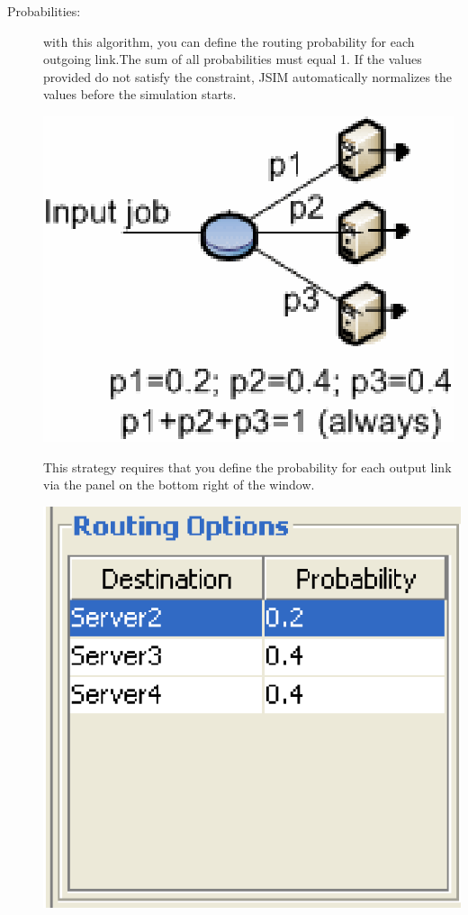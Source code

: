 \begin{description}
\item[Probabilities:] with this algorithm, you can define the routing probability for each outgoing link.The sum of all probabilities must equal 1. If the values provided do not satisfy the constraint, JSIM automatically normalizes the values before the simulation starts.
\begin{center}
\includegraphics[scale=.5]{img/jsim/probability.eps}
\end{center}
This strategy requires that you define the probability for each
output link via the panel on the bottom right of the window.
\begin{center}
\includegraphics[scale=.5]{img/jsim/prob1.eps}

\end{center}
\end{description}
